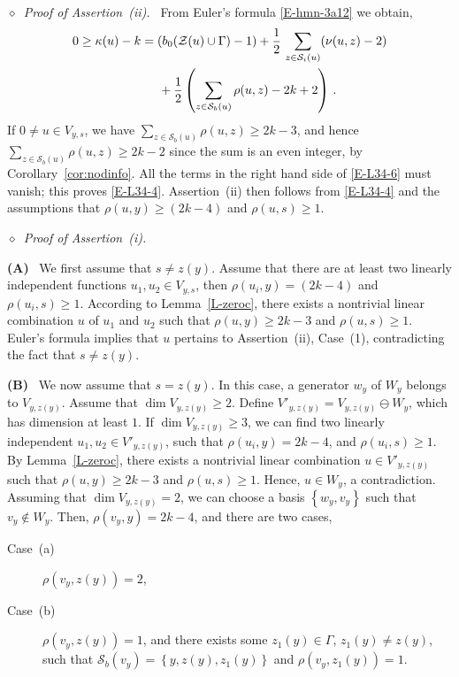 \documentclass[12pt,a4paper]{amsart}
\theoremstyle{plain} %
\theoremstyle{definition}
\numberwithin{equation}{section}
\numberwithin{figure}{section}
\numberwithin{table}{section}
\newcommand{\cS}{\mathcal{S}}
\newcommand{\cZ}{\mathcal{Z}}
\newcommand{\set}[1]{\left\lbrace #1 \right\rbrace}
\newcommand{\noi}{\noindent}
\newcommand{\noid}{\noindent $\diamond$~}
\begin{document}
\noid \emph{Proof of  Assertion~(ii).~} From Euler's formula \eqref{E-hmn-3a12} we obtain,
%
\begin{equation}\label{E-L34-6}
\begin{split}
0 \geq  \kappa(u) - k & = \left( b_0(\cZ(u) \cup \Gamma ) -1 \right) + \frac 12\, \sum_{z \in \cS_i(u)} (\nu(u,z)-2) \\
&\hspace{5mm} + \frac 12 \left( \sum_{z\in \cS_b(u)}\rho (u,z) - 2k +2\right) \,.
\end{split}
\end{equation}
%
If $0 \neq u \in V_{y,s}$, we have $\sum_{z\in \cS_b(u)}\rho (u,z) \ge 2k-3$, and hence $\sum_{z\in \cS_b(u)}\rho (u,z) \ge 2k-2$ since the sum is an even integer,  by Corollary~\ref{cor:nodinfo}. All the terms in the right hand side of \eqref{E-L34-6} must vanish; this proves \eqref{E-L34-4}.  Assertion~(ii) then follows from \eqref{E-L34-4} and the assumptions that $\rho(u,y) \ge (2k-4)$ and $\rho(u,s) \ge 1$.\medskip

\noid \emph{Proof of  Assertion~(i).}~

\noi \textbf{(A)}~ We first assume that $s \neq z(y)$. Assume that there are at least two linearly independent functions $u_1,u_2 \in V_{y,s}$, then $\rho(u_i,y) = (2k-4)$ and  $\rho(u_i,s) \ge 1$. According to Lemma~\ref{L-zeroc}, there exists a nontrivial linear combination $u$ of $u_1$ and $u_2$ such that $\rho(u,y) \ge 2k-3$ and $\rho(u,s) \ge 1$. Euler's formula implies that $u$ pertains to Assertion~(ii), Case~(1), contradicting the fact that $s \neq z(y)$.\smallskip

\noi \textbf{(B)}~ We now assume that $s = z(y)$. In this case, a generator $w_y$ of $W_y$ belongs to $V_{y,z(y)}$. Assume that $\dim V_{y,z(y)} \ge 2$. Define $V'_{y,z(y)} = V_{y,z(y)} \ominus W_y$, which has dimension at least $1$. If $\dim V_{y,z(y)} \ge 3$, we can find two linearly independent $u_1,u_2 \in V'_{y,z(y)}$, such that $\rho(u_i,y) = 2k-4$, and $\rho(u_i,s) \ge 1$. By Lemma~\ref{L-zeroc}, there exists a nontrivial linear combination $u \in V'_{y,z(y)}$ such that $\rho(u,y) \ge 2k-3$ and $\rho(u,s) \ge 1$.  Hence, $u \in W_y$, a contradiction. Assuming that $\dim V_{y,z(y)} = 2$, we can choose a basis $\set{w_y,v_y}$ such that $v_y \not \in W_y$. Then, $\rho(v_y,y) = 2k-4$, and there are two cases,\smallskip
\begin{description}
  \item[Case~(a)] $\rho(v_y,z(y))=2$,\vspace{3mm}
  \item[Case~(b)] $\rho(v_y,z(y)) = 1$, and there exists some $z_1(y) \in \Gamma $, $z_1(y) \neq z(y)$,  such that $\cS_b(v_y) = \set{y,z(y),z_1(y)}$ and $\rho(v_y,z_1(y)) = 1$.
\end{description}\smallskip
\end{document}
